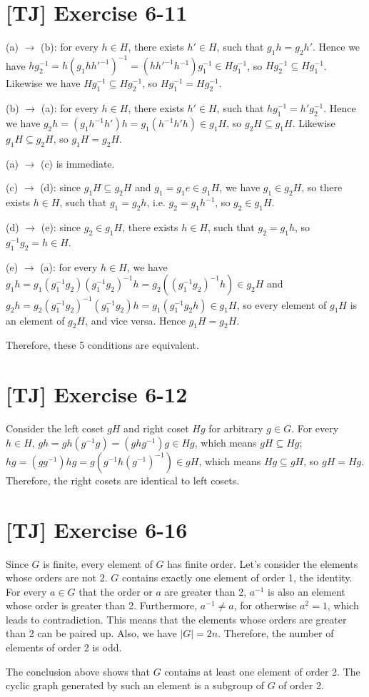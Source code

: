 \documentclass[a4paper,11pt,twocolumn]{article}
\begin{document}
  \section{[TJ] Exercise 6-11}
  (a) $\rightarrow$ (b): for every $h \in H$, there exists $h' \in H$, such that $g_1h = g_2h'$. Hence we have $hg_2^{-1} = h(g_1hh'^{-1})^{-1} = (hh'^{-1}h^{-1})g_1^{-1} \in Hg_1^{-1}$, so $Hg_2^{-1} \subseteq Hg_1^{-1}$. Likewise we have $Hg_1^{-1} \subseteq Hg_2^{-1}$, so $Hg_1^{-1} = Hg_2^{-1}$. \par
  (b) $\rightarrow$ (a): for every $h \in H$, there exists $h' \in H$, such that $hg_1^{-1} = h'g_2^{-1}$. Hence we have $g_2h = (g_1h^{-1}h')h = g_1(h^{-1}h'h) \in g_1H $, so $g_2H \subseteq g_1H$. Likewise $g_1H \subseteq g_2H$, so $g_1H = g_2H$. \par
  (a) $\rightarrow$ (c) is immediate. \par
  (c) $\rightarrow$ (d): since $g_1H \subseteq g_2H$ and $g_1 = g_1 e \in g_1 H$, we have $g_1 \in g_2H$, so there exists $h \in H$, such that $g_1 = g_2 h$, i.e. $g_2 = g_1 h^{-1}$, so $g_2 \in g_1 H$. \par
  (d) $\rightarrow$ (e): since $g_2 \in g_1 H$, there exists $h \in H$, such that $g_2 = g_1h$, so $g_1^{-1}g_2 = h \in H$. \par
  (e) $\rightarrow$ (a): for every $h \in H$, we have
  $ g_1h = g_1(g_1^{-1}g_2)(g_1^{-1}g_2)^{-1}h = g_2((g _1^{-1}g_2)^{-1}h) \in g_2H$ and $g_2h = g_2(g_1^{-1}g_2)^{-1}(g_1^{-1}g_2)h = g_1(g_1^{-1}g_2h) \in g_1 H$, so every element of $g_1 H$ is an element of $g_2H$, and vice versa. Hence $g_1H = g_2H$. \par
  Therefore, these 5 conditions are equivalent.

  \section{[TJ] Exercise 6-12}
  Consider the left coset $gH$ and right coset $Hg$ for arbitrary $g \in G$. For every $h \in H$, $gh = gh(g^{-1}g) = (ghg^{-1})g \in Hg$, which means $gH \subseteq Hg$; $hg = (gg^{-1})hg = g(g^{-1}h(g^{-1})^{-1}) \in gH$, which means $Hg \subseteq gH$, so $gH = Hg$. Therefore, the right cosets are identical to left cosets.

  \section{[TJ] Exercise 6-16}
  Since $G$ is finite, every element of $G$ has finite order. Let's consider the elements whose orders are not 2. $G$ contains exactly one element of order 1, the identity. For every $a \in G$ that the order or $a$ are greater than 2, $a^{-1}$ is also an element whose order is greater than 2. Furthermore, $a^{-1} \neq a$, for otherwise $a^2 = 1$, which leads to contradiction. This means that the elements whose orders are greater than 2 can be paired up. Also, we have $|G| = 2n$. Therefore, the number of elements of order 2 is odd. \par
  The conclusion above shows that $G$ contains at least one element of order 2. The cyclic graph generated by such an element is a subgroup of $G$ of order 2.
\end{document}
